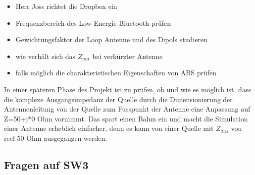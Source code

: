 \documentclass[10pt,a4paper]{report}
\begin{document}
\begin{itemize}
	\item Herr Joss richtet die Dropbox ein
	\item Frequenzbereich des Low Energie Bluetooth prüfen
	\item Gewichtungsfaktor der Loop Antenne und des Dipols studieren
	\item wie verhält sich das $Z_{ant} $ bei verkürzter Antenne
	\item falls möglich die charakteristischen Eigenschaften von ABS prüfen
\end{itemize}
In einer späteren Phase des Projekt ist zu prüfen, ob und wie es
möglich ist, dass die komplexe Ausgangsimpedanz der Quelle durch
die Dimensionierung der Antennenleitung von der Quelle zum Fusspunkt
der Antenne eine Anpassung auf Z=50+j*0 Ohm vornimmt. Das spart einen
Balun ein und macht die Simulation einer Antenne erheblich einfacher,
denn es kann von einer Quelle mit  $Z_{aus} $ von reel 50 Ohm
ausgegangen werden.
\subsection{Fragen auf SW3}
\end{document}
